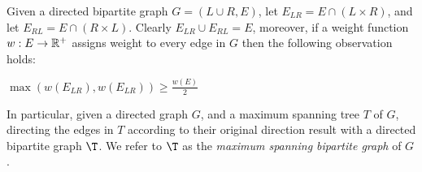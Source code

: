\label{sub:bipartition}
Given a directed bipartite graph $G = (L\cup R, E)$, 
let $E_{LR} = E \cap (L \times R)$, 
and let $E_{RL} = E \cap (R \times L)$.
Clearly $E_{LR} \cup E_{RL} = E$, moreover, 
if a weight function $w:E \rightarrow \mathbb{R^+}$ 
assigns weight to every edge in $G$ then the following observation holds:
\begin{observation}
\label{ob:bipartition}
$\max(w(E_{LR}), w(E_{LR})) \geq \frac{w(E)}{2}$
\end{observation}

In particular, given a directed graph $G$, 
and a maximum spanning tree $T$ of $G$, 
directing the edges in $T$ according to their original direction result 
with a directed bipartite graph $\T$.
We refer to $\T$ as the \emph{maximum spanning bipartite graph}
of $G$.
